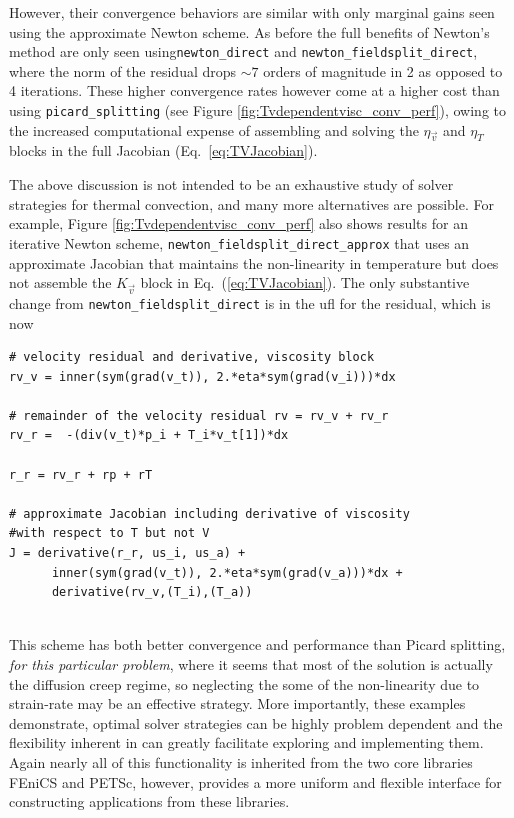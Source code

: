However, their convergence behaviors are similar with only
marginal gains seen using the approximate Newton scheme.  As before
the full benefits of Newton's method are only seen
using\texttt{newton\_direct} and \texttt{newton\_fieldsplit\_direct},
where the norm of the residual drops $\sim 7$ orders of magnitude in 2
as opposed to 4 iterations.  These higher
convergence rates however come at a higher cost than using
\texttt{picard\_splitting} (see Figure
\ref{fig:Tvdependentvisc_conv_perf}), owing to the increased
computational expense  of assembling and solving the $\eta_{\vec{v}}$
and $\eta_{T}$ blocks in the full Jacobian (Eq.\ \ref{eq:TVJacobian}). 

The above discussion is not intended to be an exhaustive study of
solver strategies for thermal convection, and many more alternatives
are possible.  For example, Figure
\ref{fig:Tvdependentvisc_conv_perf} also shows results for an iterative
Newton scheme, \texttt{newton\_fieldsplit\_direct\_approx} that uses an approximate Jacobian   that maintains the
non-linearity in temperature but does not assemble the
$K_{\vec{v}}$ block in Eq.\ (\ref{eq:TVJacobian}). The only
substantive change from \texttt{newton\_fieldsplit\_direct} is in the
ufl for the residual, which is now
\begin{lstlisting}[style=ufl]
# velocity residual and derivative, viscosity block
rv_v = inner(sym(grad(v_t)), 2.*eta*sym(grad(v_i)))*dx

# remainder of the velocity residual rv = rv_v + rv_r
rv_r =  -(div(v_t)*p_i + T_i*v_t[1])*dx

r_r = rv_r + rp + rT

# approximate Jacobian including derivative of viscosity 
#with respect to T but not V
J = derivative(r_r, us_i, us_a) + 
      inner(sym(grad(v_t)), 2.*eta*sym(grad(v_a)))*dx + 
      derivative(rv_v,(T_i),(T_a))
  
\end{lstlisting}
This scheme has both better convergence and performance than Picard
splitting, \emph{for this particular problem}, where it seems that
most of the solution is actually the diffusion creep regime, so
neglecting the some of the non-linearity due to strain-rate may be an
effective strategy.  More importantly,  these
examples demonstrate, optimal solver strategies can be highly problem
dependent and the flexibility inherent in \TF{} can greatly
facilitate exploring and implementing them.  Again nearly all of this
functionality is inherited from the two core libraries FEniCS and
PETSc, however, \TF{} provides a more uniform and flexible interface
for constructing applications from these libraries.
 


